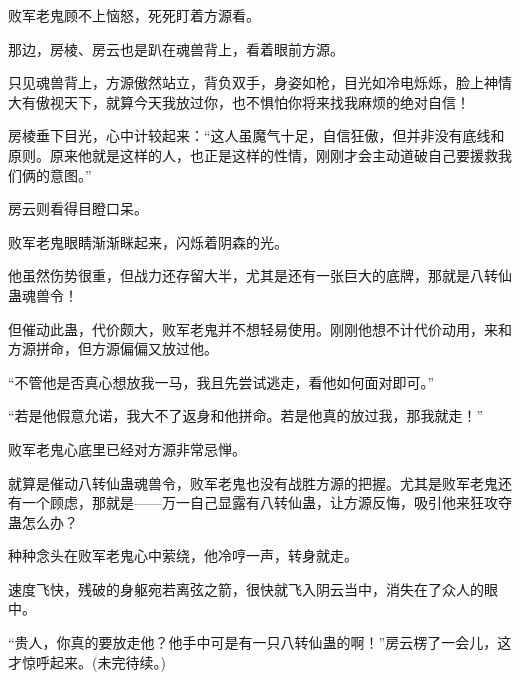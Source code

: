 \begin{this_body}
败军老鬼顾不上恼怒，死死盯着方源看。

那边，房棱、房云也是趴在魂兽背上，看着眼前方源。

只见魂兽背上，方源傲然站立，背负双手，身姿如枪，目光如冷电烁烁，脸上神情大有傲视天下，就算今天我放过你，也不惧怕你将来找我麻烦的绝对自信！

房棱垂下目光，心中计较起来：“这人虽魔气十足，自信狂傲，但并非没有底线和原则。原来他就是这样的人，也正是这样的性情，刚刚才会主动道破自己要援救我们俩的意图。”

房云则看得目瞪口呆。

败军老鬼眼睛渐渐眯起来，闪烁着阴森的光。

他虽然伤势很重，但战力还存留大半，尤其是还有一张巨大的底牌，那就是八转仙蛊魂兽令！

但催动此蛊，代价颇大，败军老鬼并不想轻易使用。刚刚他想不计代价动用，来和方源拼命，但方源偏偏又放过他。

“不管他是否真心想放我一马，我且先尝试逃走，看他如何面对即可。”

“若是他假意允诺，我大不了返身和他拼命。若是他真的放过我，那我就走！”

败军老鬼心底里已经对方源非常忌惮。

就算是催动八转仙蛊魂兽令，败军老鬼也没有战胜方源的把握。尤其是败军老鬼还有一个顾虑，那就是——万一自己显露有八转仙蛊，让方源反悔，吸引他来狂攻夺蛊怎么办？

种种念头在败军老鬼心中萦绕，他冷哼一声，转身就走。

速度飞快，残破的身躯宛若离弦之箭，很快就飞入阴云当中，消失在了众人的眼中。

“贵人，你真的要放走他？他手中可是有一只八转仙蛊的啊！”房云楞了一会儿，这才惊呼起来。(未完待续。)

\end{this_body}


